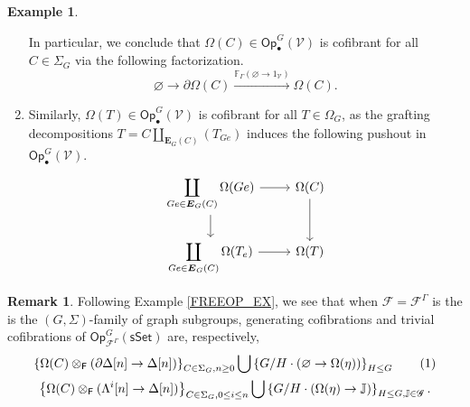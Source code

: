 \documentclass[a4paper,10pt
,draft
]{article}%
\numberwithin{equation}{section}
\numberwithin{figure}{section}
\theoremstyle{definition} %
\newtheorem{example}[equation]{Example}%
\newtheorem{remark}[equation]{Remark}%
\newcommand{\set}[1]{\left\{#1\right\}}%
\newcommand{\Fin}{\mathsf{F}}%
\newcommand{\sSet}{\ensuremath{\mathsf{sSet}}}%
\newcommand{\Op}{\mathsf{Op}}%
\newcommand{\F}{\ensuremath{\mathcal F}}
\newcommand{\V}{\ensuremath{\mathcal V}}
\newcommand{\1}{\ensuremath{\mathbbm 1}}%
\begin{document}
\begin{example}
\begin{enumerate}[label = (\roman*)]
            In particular, we conclude that $\Omega(C) \in \Op^G_\bullet(\V)$ is cofibrant for all $C \in \Sigma_G$ via the following factorization.
            \[
                  \varnothing \to \partial\Omega(C) \xrightarrow{\mathbb F_{\Gamma}(\varnothing \to 1_\V)} \Omega(C).
            \]
      \item Similarly, $\Omega(T) \in \Op^G_\bullet(\V)$ is cofibrant for all $T \in \Omega_G$, as
            the grafting decompositions $T = C \coprod_{\boldsymbol{E}_G(C)} (T_{Ge})$ induces the following pushout in $\Op^G_\bullet(\V)$.
            \[
                  \begin{tikzcd}
                        \displaystyle{
                          \coprod_{Ge \in \boldsymbol{E}_G(C)} \Omega(Ge)}
                        \arrow[r] \arrow[d]
                        &
                        \Omega(C) \arrow[d]
                        \\
                        \displaystyle{
                          \coprod_{Ge \in \boldsymbol{E}_G(C)} \Omega(T_e)}
                        \arrow[r]
                        &
                        \Omega(T)
                  \end{tikzcd}
            \]            
      \end{enumerate}
\end{example}


\begin{remark}
Following Example \ref{FREEOP_EX}, we see that
      when $\F = \F^\Gamma$ is the is the $(G, \Sigma)$-family of graph subgroups,
      generating cofibrations and trivial cofibrations of $\Op^G_{\F^\Gamma}(\sSet)$ are, respectively, 
      \begin{gather*}
            \set{\Omega(C) \otimes_\Fin(\partial \Delta[n] \to \Delta[n])}_{C \in \Sigma_G, n \geq 0} \bigcup 
            \set{G/H \cdot (\varnothing \to \Omega(\eta))}_{H \leq G}
            \stepcounter{equation}\tag{\theequation}\label{SSETGENCOF_EQ}
            \\
            \set{\Omega(C) \otimes_\Fin(\Lambda^i[n] \to \Delta[n])}_{C \in \Sigma_G, 0 \leq i \leq n} \bigcup
            \set{G/H \cdot (\Omega(\eta) \to \mathbb J)}_{H \leq G, \mathbb J \in \mathscr G}.
      \end{gather*}     
\end{remark}













\newpage
{}

\end{document}
